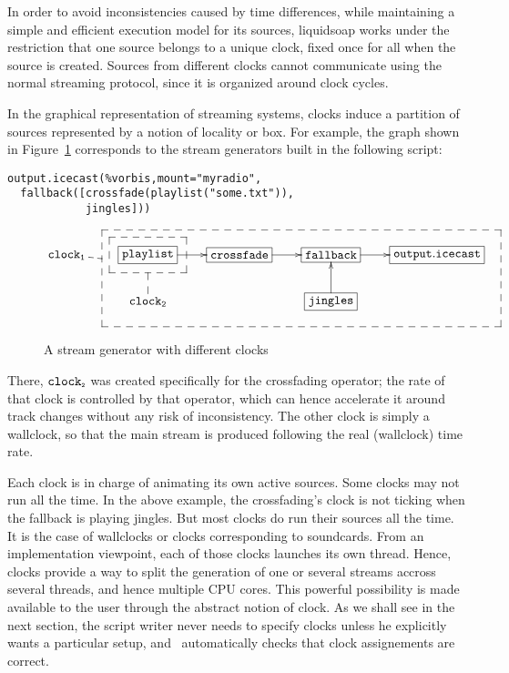 In order to avoid inconsistencies caused by time differences,
while maintaining a simple and efficient execution model for
its sources, liquidsoap works under the restriction that
one source belongs to a unique clock,
fixed once for all when the source is created.
Sources from different clocks cannot communicate using the normal
streaming protocol, since it is organized around clock cycles.

In the graphical representation of streaming systems,
clocks induce a partition of sources represented by a notion of locality
or box.
For example, the graph shown in Figure~\ref{fig:boxes}
corresponds to the stream generators built in the following
script:
\begin{verbatim}
output.icecast(%vorbis,mount="myradio",
  fallback([crossfade(playlist("some.txt")),
            jingles]))
\end{verbatim}

\begin{figure}[htpb]
 \begin{center}
\[
\def\f{\save
*+<15pt>[F--]\frm{}\ar @{--} "2,2"\restore}%
\def\g{\save
"2,4"."1,2"."1,5"!C*+<27pt>[F--]\frm{}\ar @{--} "1,1"\restore}%
\xymatrix{
   \mathtt{clock_1} & *+[F]{\mathtt{playlist}}\ar[r]\f&*+[F]{\mathtt{crossfade}}\ar[r]&  *+[F]{\mathtt{fallback}}\ar[r]&
  *+[F]{\mathtt{output.icecast}}\\
   &\mathtt{clock_2} &  & *+[F]{\mathtt{jingles}}\ar[u]\g& 
}
\]
\end{center}
 \caption{A stream generator with different clocks}
 \label{fig:boxes}
\end{figure}

There, $\verb.clock._{\tiny{\verb.2.}}$ was created specifically for the crossfading
operator; the rate of that clock is controlled by that operator,
which can hence accelerate it around track changes without any
risk of inconsistency.
The other clock is simply a wallclock, so that the main stream
is produced following the real (wallclock) time rate.

Each clock is in charge of animating its own active sources.
Some clocks may not run all the time. In the above example,
the crossfading's clock is not ticking when the fallback
is playing jingles.
But most clocks do run their sources all the time.
It is the case of wallclocks or clocks corresponding to
soundcards.
From an implementation viewpoint, each of those clocks launches
its own thread.
Hence, clocks provide a way to split the generation of one or
several streams accross several threads,
and hence multiple CPU cores.
This powerful possibility is made available to the user
through the abstract notion of clock.
As we shall see in the next section,
the script writer never needs to specify clocks unless he
explicitly wants a particular setup,
and \liquidsoap\ automatically checks that clock assignements
are correct.

